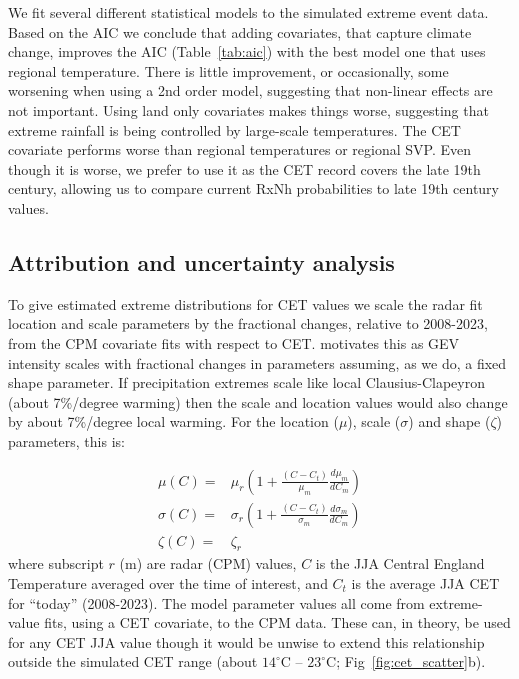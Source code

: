 \documentclass[11pt,a4paper]{article}
\begin{document}
We fit several different statistical models to the simulated  extreme event data. Based on the AIC we conclude that adding covariates, that capture climate change, improves the AIC (Table~\ref{tab:aic}) with the best model one that uses regional temperature. There is little improvement, or occasionally, some worsening when using a 2nd order model, suggesting that non-linear effects are not important. Using land only covariates makes things worse, suggesting that extreme rainfall is being controlled by large-scale temperatures.  The CET covariate performs worse than  regional  temperatures or regional SVP. Even though it is worse, we prefer to use it as the CET record covers the late 19th century, allowing us to compare current RxNh probabilities to  late 19th century values.

\subsection{Attribution and uncertainty analysis}

To give estimated extreme distributions for  CET values we  scale the radar fit location and scale parameters by the fractional changes, relative to 2008-2023, from the CPM covariate fits with respect to CET.  \cite{tett2023edinburgh} motivates this as  GEV intensity scales with fractional changes in parameters assuming, as we do, a fixed shape parameter\parencite{Coles_2001}. If precipitation extremes scale like local Clausius-Clapeyron (about 7\%/degree warming) then the scale and location values would also change by about 7\%/degree local warming.  For the location ($\mu$), scale ($\sigma$) and shape ($\zeta$) parameters, this is:

\begin{equation}\label{eq:gev_params}
\begin{aligned}
\mu(C) =& \mu_r \left( 1+  \frac{(C-C_t)}{\mu_m} \frac{d\mu_m}{dC_m}\right)\\
\sigma(C) =& \sigma_r\left ( 1+  \frac{(C-C_t)}{\sigma_m}  \frac{d\sigma_m}{dC_m}\right)\\
\zeta(C)=&\zeta_r
\end{aligned}
\end{equation}
where subscript $r$ (m) are radar (CPM) values, $C$ is the JJA Central England Temperature averaged over the time of interest, and $C_t$ is the average JJA CET for ``today'' (2008-2023). The model parameter values all come from extreme-value fits, using a CET covariate, to the CPM data. These can, in theory, be used for any CET JJA value though it would be unwise to extend this relationship outside the simulated CET range (about $14^\circ$C -- $23^\circ$C; Fig~\ref{fig:cet_scatter}b).   
\end{document}
